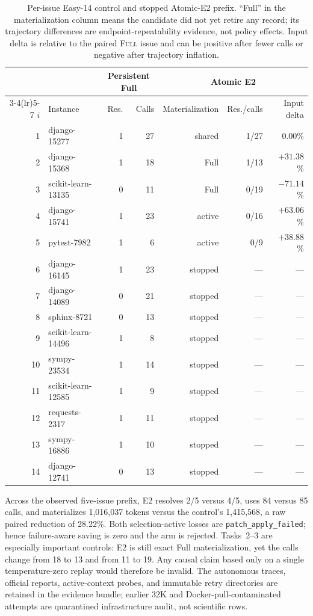 \documentclass[11pt]{article}
\begin{document}
\begin{table}[H]
\centering
\scriptsize
\caption{Per-issue Easy-14 control and stopped Atomic-E2 prefix.  ``Full'' in
the materialization column means the candidate did not yet retire any record;
its trajectory differences are endpoint-repeatability evidence, not policy
effects.  Input delta is relative to the paired \textsc{Full} issue and can be
positive after fewer calls or negative after trajectory inflation.}
\label{tab:easy14-context-ledger}
\begin{tabular}{r>{\raggedright\arraybackslash}p{.31\linewidth}rrrrr}
\toprule
& & \multicolumn{2}{c}{Persistent Full} &
\multicolumn{3}{c}{Atomic E2} \\
\cmidrule(lr){3-4}\cmidrule(lr){5-7}
$i$ & Instance & Res. & Calls & Materialization & Res./calls & Input delta \\
\midrule
1 & django-15277 & 1 & 27 & shared & 1/27 & 0.00\% \\
2 & django-15368 & 1 & 18 & Full & 1/13 & $+31.38$\% \\
3 & scikit-learn-13135 & 0 & 11 & Full & 0/19 & $-71.14$\% \\
4 & django-15741 & 1 & 23 & active & 0/16 & $+63.06$\% \\
5 & pytest-7982 & 1 & 6 & active & 0/9 & $+38.88$\% \\
6 & django-16145 & 1 & 23 & stopped & --- & --- \\
7 & django-14089 & 0 & 21 & stopped & --- & --- \\
8 & sphinx-8721 & 0 & 13 & stopped & --- & --- \\
9 & scikit-learn-14496 & 1 & 8 & stopped & --- & --- \\
10 & sympy-23534 & 1 & 14 & stopped & --- & --- \\
11 & scikit-learn-12585 & 1 & 9 & stopped & --- & --- \\
12 & requests-2317 & 1 & 11 & stopped & --- & --- \\
13 & sympy-16886 & 1 & 10 & stopped & --- & --- \\
14 & django-12741 & 0 & 13 & stopped & --- & --- \\
\bottomrule
\end{tabular}
\end{table}

Across the observed five-issue prefix, E2 resolves 2/5 versus 4/5, uses 84
versus 85 calls, and materializes 1,016,037 tokens versus the control's
1,415,568, a raw paired reduction of 28.22\%.  Both selection-active losses are
\texttt{patch\_apply\_failed}; hence failure-aware saving is zero and the arm
is rejected.  Tasks~2--3 are especially important controls: E2 is still exact
Full materialization, yet the calls change from 18 to 13 and from 11 to 19.
Any causal claim based only on a single temperature-zero replay would therefore
be invalid.  The autonomous traces, official reports, active-context probes,
and immutable retry directories are retained in the evidence bundle; earlier
32K and Docker-pull-contaminated attempts are quarantined infrastructure audit,
not scientific rows.
\end{document}
